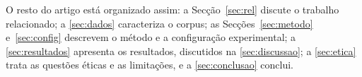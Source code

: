 O resto do artigo está organizado assim: a Secção~\ref{sec:rel} discute o trabalho relacionado; a
\ref{sec:dados} caracteriza o corpus; as Secções~\ref{sec:metodo} e~\ref{sec:config} descrevem o
método e a configuração experimental; a \ref{sec:resultados} apresenta os resultados, discutidos na
\ref{sec:discussao}; a \ref{sec:etica} trata as questões éticas e as limitações, e a
\ref{sec:conclusao} conclui.

